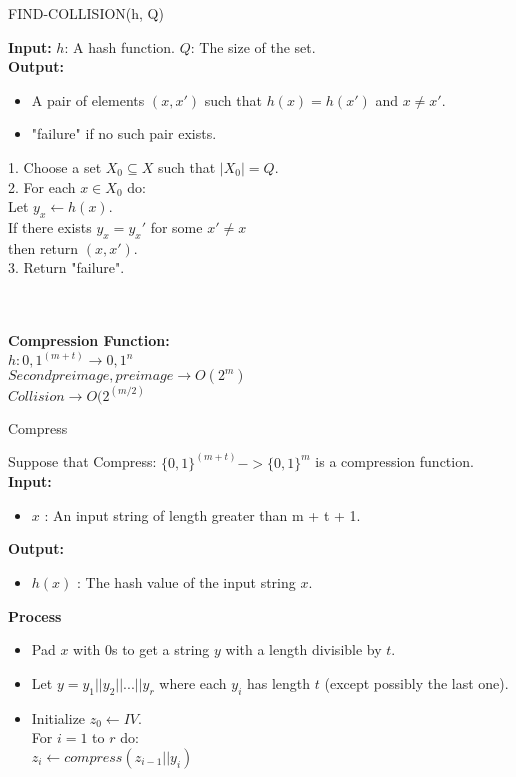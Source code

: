 \documentclass[11pt]{article}
\begin{document}
\begin{algorithm}
\caption{FIND-COLLISION(h, Q)}
\label{alg:find-collision}
\textbf{Input:}
     $h$: A hash function.\hspace{5pt}  $Q$: The size of the set.\\
\textbf{Output:}
\begin{itemize}
    \item A pair of elements $(x, x')$ such that $h(x) = h(x')$ and $x \neq x'$.
    \item "failure" if no such pair exists.
\end{itemize}
1. Choose a set $X_0 \subseteq X$ such that $|X_0| = Q$.\\
2. For each $x \in X_0$ do:\\    
        Let $y_x \leftarrow h(x)$.\\
        If there exists $y_x = y_x'$ for some $x'\neq x$\\
        then return $(x, x')$.\\    
3. Return "failure".\\\\
\end{algorithm}\\
\textbf{Compression Function:}\\
$h:{0,1}^(m+t)\rightarrow {0,1}^n$\\
$Second preimage,preimage\rightarrow O(2^m)$\\
$Collision\rightarrow O(2^(m/2)$\\
\begin{algorithm}
\caption{Compress}
\label{alg:iterated-hash}
Suppose that Compress: $ \{0, 1\}^(m+t) -> \{0, 1\}^m$ is a compression function.\\
\textbf{Input:}
\begin{itemize}
    \item $x$ : An input string of length greater than m + t + 1.
\end{itemize}

\textbf{Output:}
\begin{itemize}
    \item $h(x)$ : The hash value of the input string $x$.
\end{itemize}
\textbf{Process}
\begin{itemize}
    \item Pad $x$ with 0s to get a string $y$ with a length divisible by $t$.
    \item Let $y = y_1 || y_2 || ... || y_r$ where each $y_i$ has length $t$ (except possibly the last one).
    \item Initialize $z_0 \leftarrow IV$.\\
            For $i = 1$ to $r$ do:\\
        $z_i \leftarrow compress(z_{i - 1} || y_i)$
        
\end{itemize}
\end{algorithm}
\end{document}
